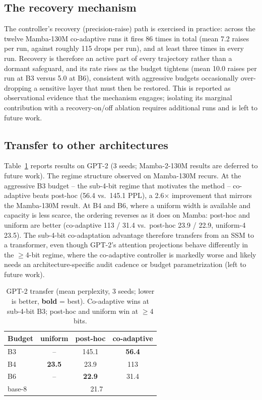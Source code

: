 \documentclass[conference]{IEEEtran}
\begin{document}
\subsection{The recovery mechanism}
\label{ssc:recovery}
The controller's recovery (precision-raise) path is exercised in practice: across
the twelve Mamba-130M co-adaptive runs it fires 86 times in total (mean 7.2 raises per
run, against roughly 115 drops per run), and at least three times in every run.
Recovery is therefore an active part of every trajectory rather than a dormant
safeguard, and its rate rises as the budget tightens (mean 10.0 raises per run at
B3 versus 5.0 at B6), consistent with aggressive budgets occasionally
over-dropping a sensitive layer that must then be restored. This is reported as
observational evidence that the mechanism engages; isolating its marginal
contribution with a recovery-on/off ablation requires additional runs and is left
to future work.

\subsection{Transfer to other architectures}
Table~\ref{tab:transfer} reports results on GPT-2 (3 seeds; Mamba-2-130M results
are deferred to future work). The regime structure observed on Mamba-130M recurs.
At the aggressive B3 budget -- the sub-4-bit regime that motivates the method --
co-adaptive beats post-hoc (56.4 vs.\ 145.1 PPL), a 2.6$\times$ improvement that mirrors
the Mamba-130M result. At B4 and B6, where a uniform width is available and capacity
is less scarce, the ordering reverses as it does on Mamba: post-hoc and uniform are
better (co-adaptive 113 / 31.4 vs.\ post-hoc 23.9 / 22.9, uniform-4 23.5). The sub-4-bit
co-adaptation advantage therefore transfers from an SSM to a transformer, even
though GPT-2's attention projections behave differently in the $\geq$4-bit regime,
where the co-adaptive controller is markedly worse and likely needs an
architecture-specific audit cadence or budget parametrization (left to future work).

\begin{table}[t]
\caption{GPT-2 transfer (mean perplexity, 3 seeds; lower is better, \textbf{bold} =
best). Co-adaptive wins at sub-4-bit B3; post-hoc and uniform win at $\geq$4 bits.}
\label{tab:transfer}
\begin{center}
\begin{tabular}{lccc}
\toprule
\textbf{Budget} & \textbf{uniform} & \textbf{post-hoc} & \textbf{co-adaptive} \\
\midrule
B3 & --            & 145.1         & \textbf{56.4} \\
B4 & \textbf{23.5} & 23.9          & 113           \\
B6 & --            & \textbf{22.9} & 31.4          \\
\midrule
base-8 & \multicolumn{3}{c}{21.7} \\
\bottomrule
\end{tabular}
\end{center}
\end{table}
\end{document}
